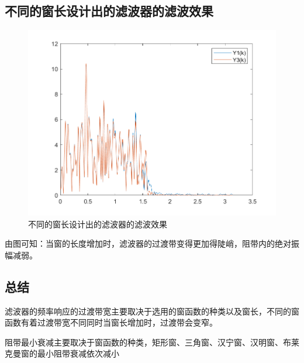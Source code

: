 \documentclass{../source/zjureport}
\begin{document}
        \subsection{不同的窗长设计出的滤波器的滤波效果}
        \begin{figure}[H]
            \centering
            \includegraphics[scale = 0.6]{figure/Y3(k)与Y1(k)区别.png}
            \caption{不同的窗长设计出的滤波器的滤波效果}
        \end{figure}
        由图可知：当窗的长度增加时，滤波器的过渡带变得更加得陡峭，阻带内的绝对振幅减弱。

        \subsection{总结}
        滤波器的频率响应的过渡带宽主要取决于选用的窗函数的种类以及窗长，不同的窗函数有着过渡带宽不同同时当窗长增加时，过渡带会变窄。

        阻带最小衰减主要取决于窗函数的种类，矩形窗、三角窗、汉宁窗、汉明窗、布莱克曼窗的最小阻带衰减依次减小
\end{document}
